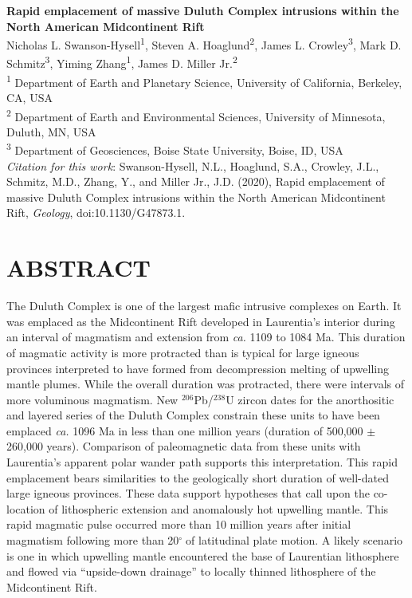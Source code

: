 \documentclass[11pt,letterpaper]{article}
\begin{document}
\begin{flushleft}

{\Large \textbf{Rapid emplacement of massive Duluth Complex intrusions within the North American Midcontinent Rift}}
\\
\singlespacing
Nicholas L. Swanson-Hysell\textsuperscript{1}, Steven A. Hoaglund\textsuperscript{2}, James L. Crowley\textsuperscript{3}, Mark D. Schmitz\textsuperscript{3}, Yiming Zhang\textsuperscript{1}, James D. Miller Jr.\textsuperscript{2}
\\
\bigskip
\textsuperscript{1} Department of Earth and Planetary Science, University of California, Berkeley, CA, USA\\
\textsuperscript{2} Department of Earth and Environmental Sciences, University of Minnesota, Duluth, MN, USA \\
\textsuperscript{3} Department of Geosciences, Boise State University, Boise, ID, USA \\
\bigskip
\textit{Citation for this work}: Swanson-Hysell, N.L., Hoaglund, S.A., Crowley, J.L., Schmitz, M.D., Zhang, Y., and Miller Jr., J.D. (2020), Rapid emplacement of massive Duluth Complex intrusions within the North American Midcontinent Rift, \textit{Geology}, doi:10.1130/G47873.1.
\smallskip
\end{flushleft}


\section*{ABSTRACT}

The Duluth Complex is one of the largest mafic intrusive complexes on Earth. It was emplaced as the Midcontinent Rift developed in Laurentia's interior during an interval of magmatism and extension from \textit{ca.} 1109 to 1084 Ma. This duration of magmatic activity is more protracted than is typical for large igneous provinces interpreted to have formed from decompression melting of upwelling mantle plumes. While the overall duration was protracted, there were intervals of more voluminous magmatism. New $^{206}$Pb/$^{238}$U zircon dates for the anorthositic and layered series of the Duluth Complex constrain these units to have been emplaced \textit{ca.} 1096 Ma in less than one million years (duration of 500,000 $\pm$ 260,000 years). Comparison of paleomagnetic data from these units with Laurentia's apparent polar wander path supports this interpretation. This rapid emplacement bears similarities to the geologically short duration of well-dated large igneous provinces. These data support hypotheses that call upon the co-location of lithospheric extension and anomalously hot upwelling mantle. This rapid magmatic pulse occurred more than 10 million years after initial magmatism following more than 20$^{\circ}$$\;$of latitudinal plate motion. A likely scenario is one in which upwelling mantle encountered the base of Laurentian lithosphere and flowed via ``upside-down drainage'' to locally thinned lithosphere of the Midcontinent Rift.
\end{document}
